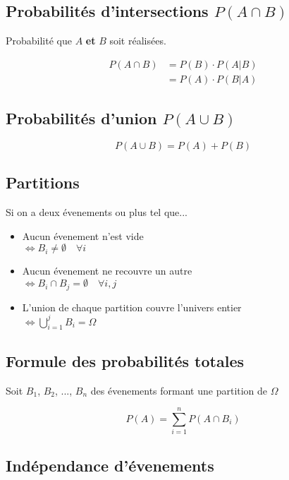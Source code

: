 \documentclass{article}
\begin{document}
\subsection{Probabilités d'intersections $P(A \cap B)$}
Probabilité que $A$ \textbf{et} $B$ soit réalisées.

\begin{equation*}
    \begin{split}
        P(A \cap B) &= P(B)\cdot P(A|B)\\
                    &= P(A)\cdot P(B|A)
    \end{split}
\end{equation*}

\subsection{Probabilités d'union $P(A \cup B)$}
\[P(A \cup B) = P(A) + P(B)\]


\subsection{Partitions}

Si on a deux évenements ou plus tel que...
\begin{itemize}
    \item Aucun évenement n'est vide \\$\iff B_i  \ne \emptyset \quad \forall i$
    \item Aucun évenement ne recouvre un autre \\$\iff B_i \cap B_j = \emptyset \quad \forall i, j$
    \item L'union de chaque partition couvre l'univers entier \\$\iff \bigcup_{i=1}^j B_i = \Omega$
\end{itemize}

\subsection{Formule des probabilités totales}

Soit $B_1$, $B_2$, ..., $B_n$ des évenements formant une partition de $\Omega$

\[P(A) = \sum_{i=1}^n P(A \cap B_i)\]

\subsection{Indépendance d'évenements}
\end{document}

